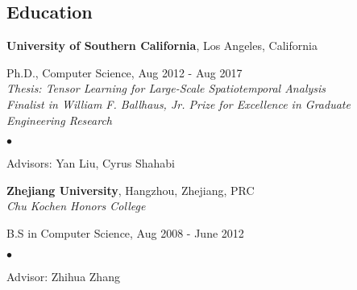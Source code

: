 \documentclass[margin,line]{res}
\newenvironment{list1}{
  \begin{list}{\ding{113}}{%
      \setlength{\itemsep}{0in}
      \setlength{\parsep}{0in} \setlength{\parskip}{0in}
      \setlength{\topsep}{0in} \setlength{\partopsep}{0in} 
      \setlength{\leftmargin}{0.17in}}}{\end{list}}
\newenvironment{list2}{
  \begin{list}{$\bullet$}{%
      \setlength{\itemsep}{0in}
      \setlength{\parsep}{0in} \setlength{\parskip}{0in}
      \setlength{\topsep}{0in} \setlength{\partopsep}{0in} 
      \setlength{\leftmargin}{0.2in}}}{\end{list}}
\begin{document}
\begin{resume}
\section{\sc Education}
{\bf University of Southern California}, Los Angeles, California
\begin{list1}
\item[] Ph.D., Computer Science, Aug 2012 - Aug 2017 \\
{\em Thesis: Tensor Learning for Large-Scale Spatiotemporal Analysis} \\
{\em Finalist in William F. Ballhaus, Jr. Prize for Excellence in Graduate Engineering Research}
\begin{list2}
\vspace*{.05in}
\item Advisors:  Yan Liu, Cyrus Shahabi
\end{list2}
\vspace*{.05in}
\end{list1}



{\bf Zhejiang University}, Hangzhou, Zhejiang, PRC\\
{\em Chu Kochen Honors College} 
\begin{list1}
\item[] B.S in Computer Science, Aug 2008 - June 2012 %
\begin{list2}
\vspace*{.05in}
\item Advisor:  Zhihua Zhang
\end{list2}
\end{list1}


\end{resume}
\end{document}
